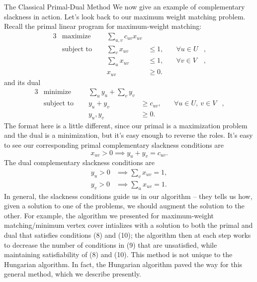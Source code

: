 \begin{section}{The Classical Primal-Dual Method}
	We now give an example of complementary slackness in action. Let's look back to our maximum 
	weight matching problem. Recall the primal linear program for maximum-weight matching:
	\begin{alignat}{3}
		& \text{maximize } & \sum_{u,v} c_{uv} x_{uv}& \\
		& \text{subject to } \quad & \sum_{v} x_{uv} & \leq 1, & \quad \forall u\in U&, \\
				     &\quad & \sum_{u} x_{uv} & \leq 1, & \quad \forall v\in V &, \\
				&& x_{uv} & \geq 0.
	\end{alignat}
	and its dual
	\begin{alignat}{3}
		& \text{minimize } & \sum_u y_u + \sum_v y_v& \\
		& \text{subject to } \quad & y_u + y_v & \geq c_{uv}, & \quad \forall 
					u\in U,\ v\in V &, \\
				    && y_u,y_v & \geq 0.
	\end{alignat}
	The format here is a little different, since our primal is a maximization problem and the dual 
	is a minimization, but it's easy enough to reverse the roles. It's easy to see our 
	corresponding primal complementary slackness conditions are
	\begin{equation}
		x_{uv} > 0 \implies y_u + y_v = c_{uv}.
	\end{equation}
	The dual complementary slackness conditions are
	\begin{align}
		y_u > 0 &\implies \sum_v x_{uv} = 1,\\
		y_v > 0 &\implies \sum_u x_{uv} = 1.
	\end{align}
	In general, the slackness conditions guide us in our algorithm -- they tells us how, given a 
	solution to one of the problems, we should augment the solution to the other. For example, the 
	algorithm we presented for maximum-weight matching/minimum vertex cover intializes with 
	a solution to both the primal and dual that satisfies conditions (8) and (10); the algorithm 
	then at each step works to decrease the number of conditions in (9) that are unsatisfied, while 
	maintaining satisfiability of (8) and (10). This method is not unique to the Hungarian 
	algorithm. In fact, the Hungarian algorithm paved the way for this general method, which we 
	describe presently.


\end{section}
